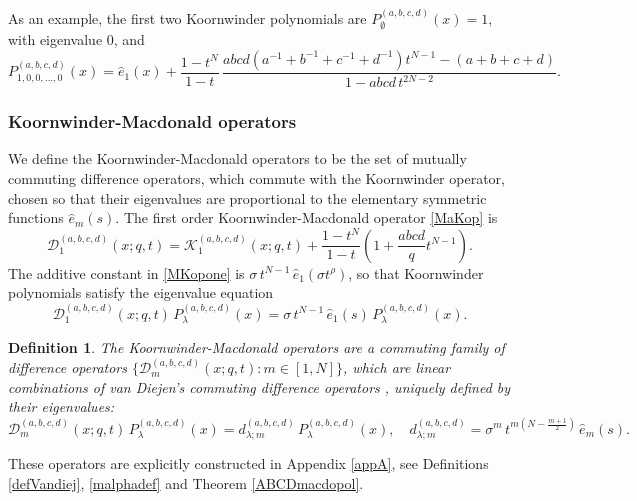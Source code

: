 \documentclass[12pt]{amsart}
\newtheorem{defn}[thm]{Definition}
\newcommand{\D}{{\mathcal{D}}}
\newcommand{\K}{{\mathcal K}}
\numberwithin{equation}{section}
\begin{document}
As an example, the first two Koornwinder polynomials are  $P_\emptyset^{(a,b,c,d)}(x)=1$, with eigenvalue 0, and
$$P_{1,0,0,...,0}^{(a,b,c,d)}(x)={\hat e}_1(x)+\frac{1-t^N}{1-t}\, 
\frac{  abcd(a^{-1}+b^{-1}+c^{-1}+d^{-1})t^{N-1}-(a+b+c+d)}{1-a b c d \, t^{2N-2}}.$$
%

\subsubsection{Koornwinder-Macdonald operators}
We define the Koornwinder-Macdonald operators to be the set of mutually commuting difference operators, which commute with the Koornwinder operator, chosen so that their eigenvalues are proportional to the elementary symmetric functions $\hat e_m(s)$.
%
The first order Koornwinder-Macdonald operator \eqref{MaKop}
is
\begin{equation}\label{MKopone}
{\mathcal D}_1^{(a,b,c,d)}(x;q,t)%
%
%
=\K_1^{(a,b,c,d)}(x;q,t)+\frac{1-t^N}{1-t}\left( 1+ \frac{abcd}{q}t^{N-1}\right).
\end{equation}
The additive constant in \eqref{MKopone} is $\sigma \,t^{N-1}\,{\hat e}_1(\sigma t^\rho)$, so that Koornwinder polynomials satisfy the eigenvalue equation
%
%
\begin{equation}\label{eigenKo}
{\mathcal D}_1^{(a,b,c,d)}(x;q,t)\, P_\lambda^{(a,b,c,d)}(x)= \sigma \,t^{N-1}\, 
{\hat e}_1(s)\, P_\lambda^{(a,b,c,d)}(x).
\end{equation}

%
%
\begin{defn}\label{KorMacdef}
The Koornwinder-Macdonald operators are a commuting family of difference operators $\{\D_m^{(a,b,c,d)}(x;q,t): m\in [1,N]\}$, which are linear
combinations of van Diejen's commuting difference operators \cite{vDselfdual}, uniquely defined by their eigenvalues: 
\begin{equation}
{\mathcal D}_m^{(a,b,c,d)}(x;q,t)\, P_\lambda^{(a,b,c,d)}(x)= d_{\lambda;m}^{(a,b,c,d)}\, P_\lambda^{(a,b,c,d)}(x),\quad d_{\lambda;m}^{(a,b,c,d)}= \sigma^m\,t^{m(N-\frac{m+1}{2})}\, {\hat e}_m(s). \label{eigenvecabcd}
%
\end{equation}
%
\end{defn}
These  operators are explicitly constructed in Appendix \ref{appA}, see Definitions \ref{defVandiej},  \ref{malphadef} and Theorem \ref{ABCDmacdopol}.
\end{document}
